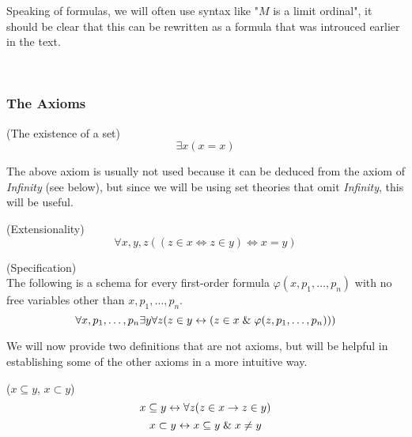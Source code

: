 Speaking of formulas, we will often use syntax like "$M$ is a limit ordinal", it should be clear that this can be rewritten as a formula that was introuced earlier in the text.

\


\subsubsection{The Axioms}

\begin{definition}{(The existence of a set)}\label{def:existence_of_a_set}
\begin{equation}
\exists x (x = x)
\end{equation}
\end{definition}
The above axiom is usually not used because it can be deduced from the axiom of \emph{Infinity} (see below), but since we will be using set theories that omit \emph{Infinity}, this will be useful.

\begin{definition}{(Extensionality)}\label{def:extensionality}
\begin{equation}
\forall x, y, z ((z \in x \iff z \in y) \iff x = y)
\end{equation}
\end{definition}

\begin{definition}{(Specification)}\label{def:specification}\\
The following is a schema for every first-order formula $\varphi(x, p_1, \ldots, p_n)$ with no free variables other than $x, p_1, \ldots, p_n$.
\begin{equation}
\forall x, p_1, \ldots, p_n \exists y \forall z ( z \in y \leftrightarrow ( z \in x \mathrel{\&} \varphi(z, p_1, \ldots, p_n)))
\end{equation}
\end{definition}

We will now provide two definitions that are not axioms, but will be helpful in establishing some of the other axioms in a more intuitive way.
\begin{definition}{($x \subseteq y$, $x \subset y$)}
\begin{equation}
x \subseteq y \leftrightarrow \forall z(z \in x \rightarrow z \in y)
\end{equation}
\begin{equation}
x \subset y \leftrightarrow x \subseteq y \mathrel{\&} x \neq y
\end{equation}
\end{definition}

